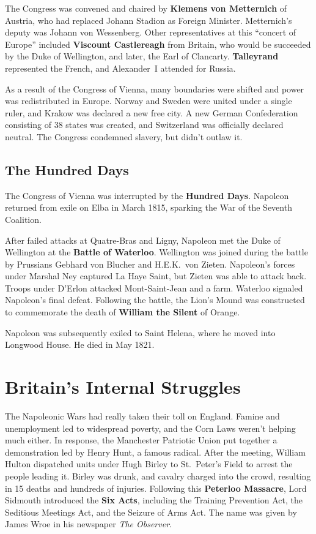 The Congress was convened and chaired by \textbf{Klemens von Metternich} of Austria,
who had replaced Johann Stadion as Foreign Minister.
Metternich's deputy was Johann von Wessenberg.
Other representatives at this ``concert of Europe'' included
\textbf{Viscount Castlereagh} from Britain, who would be succeeded by the Duke of Wellington,
and later, the Earl of Clancarty.
\textbf{Talleyrand} represented the French, and Alexander~I attended for Russia.

As a result of the Congress of Vienna, many boundaries were shifted and power was redistributed in Europe.
Norway and Sweden were united under a single ruler, and Krakow was declared a new free city.
A new German Confederation consisting of 38 states was created, and Switzerland was officially declared neutral.
The Congress condemned slavery, but didn't outlaw it.

\subsection*{The Hundred Days}

The Congress of Vienna was interrupted by the \textbf{Hundred Days}.
Napoleon returned from exile on Elba in March 1815,
sparking the War of the Seventh Coalition.

After failed attacks at Quatre-Bras and Ligny,
Napoleon met the Duke of Wellington at the \textbf{Battle of Waterloo}.
Wellington was joined during the battle by Prussians Gebhard von Blucher and H.E.K.\ von Zieten.
Napoleon's forces under Marshal Ney captured La Haye Saint, but Zieten was able to attack back.
Troops under D'Erlon attacked Mont-Saint-Jean and a farm.
Waterloo signaled Napoleon's final defeat.
Following the battle,
the Lion's Mound was constructed to commemorate the death of \textbf{William the Silent} of Orange.

Napoleon was subsequently exiled to Saint Helena, where he moved into Longwood House.
He died in May 1821.

\section{Britain's Internal Struggles}

The Napoleonic Wars had really taken their toll on England.
Famine and unemployment led to widespread poverty, and the Corn Laws weren't helping much either.
In response, the Manchester Patriotic Union put together a demonstration led by Henry Hunt, a famous radical.
After the meeting,
William Hulton dispatched units under Hugh Birley to St.\ Peter's Field to arrest the people leading it.
Birley was drunk, and cavalry charged into the crowd, resulting in 15 deaths and hundreds of injuries.
Following this \textbf{Peterloo Massacre},
Lord Sidmouth introduced the \textbf{Six Acts}, including
the Training Prevention Act,
the Seditious Meetings Act,
and the Seizure of Arms Act.
The name was given by James Wroe in his newspaper \textit{The Observer}.

